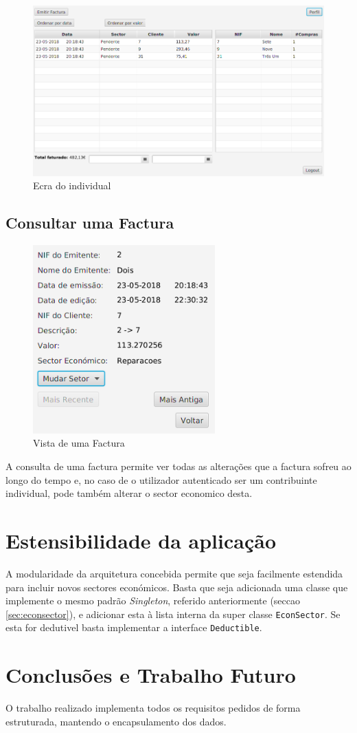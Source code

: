 \documentclass[12pt,a4paper]{report}
\begin{document}
\begin{figure}[h]
    \centering
    \includegraphics[width=\textwidth]{./images/empresaScreen.png}
    \caption{Ecra do individual}
    \label{fig:individual}
\end{figure}

    \section{Consultar uma Factura}
    \label{sec:viewFactura}
\begin{figure}
    \centering
    \includegraphics[width=7cm]{./images/facturaView.png}
    \caption{Vista de uma Factura}
    \label{fig:viewFactura}
\end{figure}
    A consulta de uma factura permite ver todas as alterações que a factura
    sofreu ao longo do tempo e, no caso de o utilizador autenticado ser
    um contribuinte individual, pode também alterar o sector economico desta.

\chapter{Estensibilidade da aplicação}
    A modularidade da arquitetura concebida permite que seja facilmente
    estendida para incluir novos sectores económicos. Basta que seja
    adicionada uma classe que implemente o mesmo padrão \textit{Singleton},
    referido anteriormente (seccao \ref{sec:econsector}), e adicionar esta à lista
    interna da super classe \texttt{EconSector}. Se esta for dedutivel
    basta implementar a interface \texttt{Deductible}.

\chapter{Conclusões e Trabalho Futuro}
    O trabalho realizado implementa todos os requisitos
    pedidos de forma estruturada, mantendo o encapsulamento dos dados.
\end{document}
